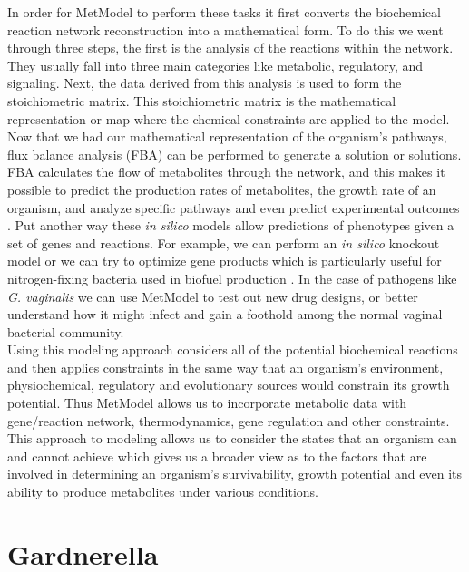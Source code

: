 %
%
%
\indent In order for MetModel to perform these tasks it first converts the biochemical reaction network reconstruction into a mathematical form.  To do this we went through three steps, the first is the analysis of the reactions within the network. They usually fall into three main categories like metabolic, regulatory, and signaling. Next, the data derived from this analysis is used to form the stoichiometric matrix. This stoichiometric matrix is the mathematical representation or map where the chemical constraints are applied to the model. Now that we had our mathematical representation of the organism's pathways, flux balance analysis (FBA) can be performed to generate a solution or solutions\citep{orth_what_2010}. FBA calculates the flow of metabolites through the network, and this makes it possible to predict the production rates of metabolites, the growth rate of an organism, and analyze specific pathways and even predict experimental outcomes \citep{lee_complementary_2005}. Put another way these \textit{in silico} models allow predictions of  phenotypes given a set of genes and reactions. For example, we can perform an \textit{in silico} knockout model or we can try to optimize gene products which is particularly useful for nitrogen-fixing bacteria used in biofuel production \citep{nogales_silico_2012}. In the case of pathogens like \textit{G. vaginalis} we can use MetModel to test out new drug designs, or better understand how it might infect and gain a foothold among the normal vaginal bacterial community.\\
\indent Using this modeling approach considers all of the potential biochemical reactions and then applies constraints in the same way that an organism's environment, physiochemical, regulatory and evolutionary sources would constrain its growth potential. Thus MetModel allows us to incorporate metabolic data with gene/reaction network, thermodynamics, gene regulation and other constraints. This approach to modeling allows us to consider the states that an organism can and cannot achieve which gives us a broader view as to the factors that are involved in determining an organism's survivability, growth potential and even its ability to produce metabolites under various conditions.

\section{Gardnerella}

